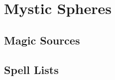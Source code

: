 \chapter{Mystic Spheres}\label{Mystic Spheres}

\section{Magic Sources}\label{Magic Sources}

    

\newpage
\section{Spell Lists}\label{Spell Lists}

    


